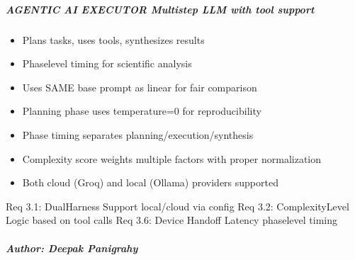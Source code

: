 \documentclass[letterpaper,10pt,english]{sphinxmanual}
\begin{document}
\subparagraph{AGENTIC AI EXECUTOR \textendash{} Multi\sphinxhyphen{}step LLM with tool support}
\label{\detokenize{core.execution.agentic:agentic-ai-executor-multi-step-llm-with-tool-support}}\begin{description}
\begin{itemize}
\item {} 
\sphinxAtStartPar
Plans tasks, uses tools, synthesizes results

\item {} 
\sphinxAtStartPar
Phase\sphinxhyphen{}level timing for scientific analysis

\end{itemize}

\begin{itemize}
\item {} 
\sphinxAtStartPar
Uses SAME base prompt as linear for fair comparison

\item {} 
\sphinxAtStartPar
Planning phase uses temperature=0 for reproducibility

\item {} 
\sphinxAtStartPar
Phase timing separates planning/execution/synthesis

\item {} 
\sphinxAtStartPar
Complexity score weights multiple factors with proper normalization

\item {} 
\sphinxAtStartPar
Both cloud (Groq) and local (Ollama) providers supported

\end{itemize}

\sphinxAtStartPar
Req 3.1: Dual\sphinxhyphen{}Harness Support \textendash{} local/cloud via config
Req 3.2: Complexity\sphinxhyphen{}Level Logic \textendash{} based on tool calls
Req 3.6: Device Handoff Latency \textendash{} phase\sphinxhyphen{}level timing

\end{description}


\subparagraph{Author: Deepak Panigrahy}
\label{\detokenize{core.execution.agentic:author-deepak-panigrahy}}
\end{document}
